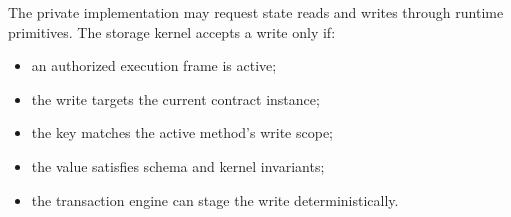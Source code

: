 The private implementation may request state reads and writes through runtime primitives. The storage kernel accepts a write only if:

\begin{itemize}
  \item an authorized execution frame is active;
  \item the write targets the current contract instance;
  \item the key matches the active method's write scope;
  \item the value satisfies schema and kernel invariants;
  \item the transaction engine can stage the write deterministically.
\end{itemize}
